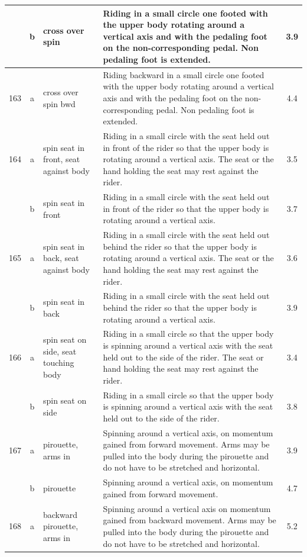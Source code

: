 \begin{longtable}{|r|c|p{4cm}|p{8cm}|c|}
\hline
  & b & cross over spin & Riding in a small circle one footed with the upper body rotating around a vertical axis and with the pedaling foot on the non-corresponding pedal. Non pedaling foot is extended. & 3.9 \\ 
\hline
163 & a & cross over spin bwd & Riding backward in a small circle one footed with the upper body rotating around a vertical axis and with the pedaling foot on the non-corresponding pedal. Non pedaling foot is extended.  & 4.4 \\ 
\hline
164 & a & spin seat in front, seat against body & Riding in a small circle with the seat held out in front of the rider so that the upper body is rotating around a vertical axis. The seat or the hand holding the seat may rest against the rider.  & 3.5 \\ 
\hline
  & b & spin seat in front  & Riding in a small circle with the seat held out in front of the rider so that the upper body is rotating around a vertical axis.  & 3.7 \\ 
\hline
165 & a & spin seat in back, seat against body  & Riding in a small circle with the seat held out behind the rider so that the upper body is rotating around a vertical axis. The seat or the hand holding the seat may rest against the rider. & 3.6 \\ 
\hline
  & b & spin seat in back & Riding in a small circle with the seat held out behind the rider so that the upper body is rotating around a vertical axis. & 3.9 \\ 
\hline
166 & a & spin seat on side, seat touching body & Riding in a small circle so that the upper body is spinning around a vertical axis with the seat held out to the side of the rider. The seat or hand holding the seat may rest against the rider. & 3.4 \\ 
\hline
  & b & spin seat on side & Riding in a small circle so that the upper body is spinning around a vertical axis with the seat held out to the side of the rider. & 3.8 \\ 
\hline
167 & a & pirouette, arms in  & Spinning around a vertical axis, on momentum gained from forward movement. Arms may be pulled into the body during the pirouette and do not have to be stretched and horizontal.  & 3.9 \\ 
\hline
  & b & pirouette & Spinning around a vertical axis, on momentum gained from forward movement.  & 4.7 \\ 
\hline
168 & a & backward pirouette, arms in & Spinning around a vertical axis on momentum gained from backward movement. Arms may be pulled into the body during the pirouette and do not have to be stretched and horizontal.  & 5.2 \\ 

\end{longtable}
